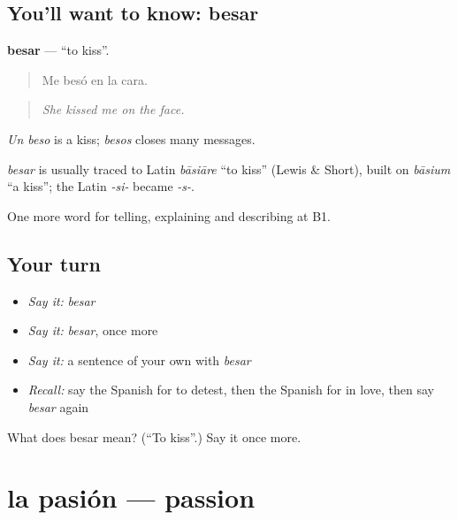 \subsection*{You'll want to know: besar}
\textbf{besar} — \textquotedblleft{}to kiss\textquotedblright{}.

\begin{quote}
Me besó en la cara.
\end{quote}

\begin{quote}
\emph{She kissed me on the face.}
\end{quote}

\emph{Un beso} is a kiss; \emph{besos} closes many messages.

\begin{cousinweb}
\emph{besar} is usually traced to Latin \emph{bāsiāre} \textquotedblleft{}to kiss\textquotedblright{} (Lewis \& Short), built on \emph{bāsium} \textquotedblleft{}a kiss\textquotedblright{}; the Latin \emph{-si-} became \emph{-s-}.
\end{cousinweb}

\begin{grammarlens}[title={What you've built}]
One more word for telling, explaining and describing at B1.
\end{grammarlens}

\subsection*{Your turn}
\begin{itemize}
\raggedright
  \item \emph{Say it:} \emph{besar}
  \item \emph{Say it:} \emph{besar}, once more
  \item \emph{Say it:} a sentence of your own with \emph{besar}
  \item \emph{Recall:} say the Spanish for to detest, then the Spanish for in love, then say \emph{besar} again
\end{itemize}

\begin{tcolorbox}[breakable,colback=teal!4,colframe=teal!35!black,title={Before you move on}]
What does besar mean? (\textquotedblleft{}To kiss\textquotedblright{}.) Say it once more.
\end{tcolorbox}
\section[la pasión]{la pasión — passion}

